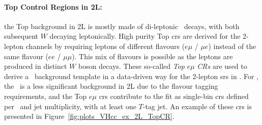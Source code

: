 \paragraph{Top Control Regions in 2L:} the Top background in 2L is mostly made of di-leptonic \ttb\ decays, with both subsequent $W$ decaying leptonically. High purity Top \glspl{cr} are derived for the 2-lepton channels by requiring leptons of different flavours ($e\mu$ / $\mu e$) instead of the same flavour ($ee$ / $\mu\mu$). This mix of flavours is possible as the leptons are produced in distinct $W$ boson decays. These so-called \textit{Top} $e\mu$ \textit{CRs} are used to derive a \ttb\ background template in a data-driven way for the 2-lepton \glspl{sr} in \vhb. For \vhc, the \ttb\ is a less significant background in 2L due to the flavour tagging requirements, and the Top $e\mu$ \glspl{cr} contribute to the fit as single-bin \glspl{cr} defined per \ptv\ and jet multiplicity, with at least one $T$-tag jet. An example of these \glspl{cr} is presented in Figure~\ref{fig:plots_VHcc_ex_2L_TopCR}.

